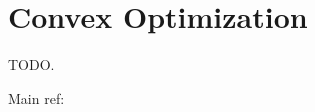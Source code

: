 
\chapter{Convex Optimization}

\label{chap-convex-optim}

TODO.

Main ref: \cite{ciarlet1982introduction,boyd2004convex}




